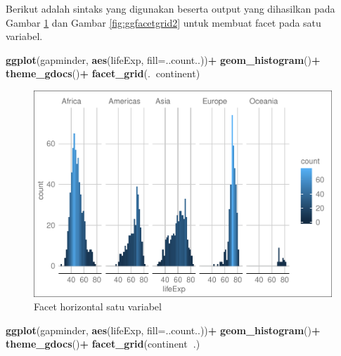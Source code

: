 \documentclass[]{book}
\newenvironment{Shaded}{\begin{snugshade}}{\end{snugshade}}
\newcommand{\KeywordTok}[1]{\textcolor[rgb]{0.13,0.29,0.53}{\textbf{#1}}}
\newcommand{\DataTypeTok}[1]{\textcolor[rgb]{0.13,0.29,0.53}{#1}}
\newcommand{\StringTok}[1]{\textcolor[rgb]{0.31,0.60,0.02}{#1}}
\newcommand{\OperatorTok}[1]{\textcolor[rgb]{0.81,0.36,0.00}{\textbf{#1}}}
\newcommand{\NormalTok}[1]{#1}
\begin{document}
Berikut adalah sintaks yang digunakan beserta output yang dihasilkan
pada Gambar \ref{fig:ggfacetgrid} dan Gambar \ref{fig:ggfacetgrid2}
untuk membuat facet pada satu variabel.

\begin{Shaded}
\begin{Highlighting}[]
\KeywordTok{ggplot}\NormalTok{(gapminder, }\KeywordTok{aes}\NormalTok{(lifeExp, }\DataTypeTok{fill=}\NormalTok{..count..))}\OperatorTok{+}
\StringTok{  }\KeywordTok{geom_histogram}\NormalTok{()}\OperatorTok{+}
\StringTok{  }\KeywordTok{theme_gdocs}\NormalTok{()}\OperatorTok{+}
\StringTok{  }\KeywordTok{facet_grid}\NormalTok{(.}\OperatorTok{~}\NormalTok{continent)}
\end{Highlighting}
\end{Shaded}

\begin{figure}

{\centering \includegraphics[width=0.9\linewidth]{EnvStat_files/figure-latex/ggfacetgrid-1} 

}

\caption{Facet horizontal satu variabel}\label{fig:ggfacetgrid}
\end{figure}

\begin{Shaded}
\begin{Highlighting}[]
\KeywordTok{ggplot}\NormalTok{(gapminder, }\KeywordTok{aes}\NormalTok{(lifeExp, }\DataTypeTok{fill=}\NormalTok{..count..))}\OperatorTok{+}
\StringTok{  }\KeywordTok{geom_histogram}\NormalTok{()}\OperatorTok{+}
\StringTok{  }\KeywordTok{theme_gdocs}\NormalTok{()}\OperatorTok{+}
\StringTok{  }\KeywordTok{facet_grid}\NormalTok{(continent}\OperatorTok{~}\NormalTok{.)}
\end{Highlighting}
\end{Shaded}
\end{document}
